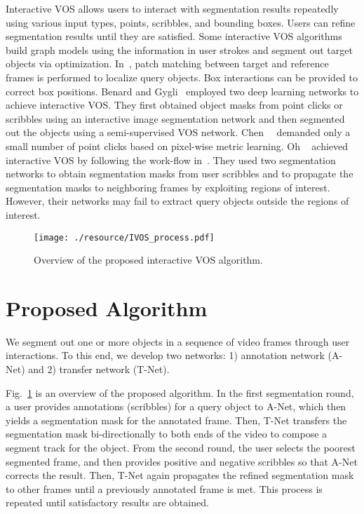 \documentclass[runningheads]{llncs}
\begin{document}
Interactive VOS allows users to interact with segmentation results repeatedly using various input types, \eg points, scribbles, and bounding boxes. Users can refine segmentation results until they are satisfied. Some interactive VOS algorithms~\cite{wang2005interactive, price2009livecut, shankar2015video} build graph models using the information in user strokes and segment out target objects via optimization. In~\cite{bai2009video,fan2015jumpcut}, patch matching between target and reference frames is performed to localize query objects. Box interactions can be provided to correct box positions. Benard and Gygli~\cite{benard2017interactive} employed two deep learning networks to achieve interactive VOS. They first obtained object masks from point clicks or scribbles using an interactive image segmentation network and then segmented out the objects using a semi-supervised VOS network. Chen~\etal~\cite{chen2018blazingly} demanded only a small number of point clicks based on pixel-wise metric learning. Oh \etal~\cite{Oh2019CVPR} achieved interactive VOS by following the work-flow in~\cite{DAVISchallenge2018}. They used two segmentation networks to obtain segmentation masks from user scribbles and to propagate the segmentation masks to neighboring frames by exploiting regions of interest. However, their networks may fail to extract query objects outside the regions of interest.


\begin{figure}[t]
\centering
    \texttt{[image: ./resource/IVOS\_process.pdf]}
    \caption{Overview of the proposed interactive VOS algorithm.}
    \label{fig:IVOS_process}
\end{figure}

\section{Proposed Algorithm} \label{sec3:Proposed Algorithm}
We segment out one or more objects in a sequence of video frames through user interactions. To this end, we develop two networks: 1) annotation network (A-Net) and 2) transfer network (T-Net).

Fig.~\ref{fig:IVOS_process} is an overview of the proposed algorithm. In the first segmentation round, a user provides annotations (\ie scribbles) for a query object to A-Net, which then yields a segmentation mask for the annotated frame. Then, T-Net transfers the segmentation mask bi-directionally to both ends of the video to compose a segment track for the object. From the second round, the user selects the poorest segmented frame, and then provides positive and negative scribbles so that A-Net corrects the result. Then, T-Net again propagates the refined segmentation mask to other frames until a previously annotated frame is met. This process is repeated until satisfactory results are obtained.
\end{document}
